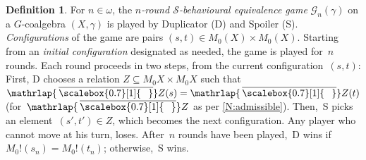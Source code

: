 \documentclass[sigconf,
			final%
			nonacm
                        ]{acmart}
\numberwithin{equation}{section}
\numberwithin{equation}{section}
\theoremstyle{plain}
\theoremstyle{definition}
\newtheorem{defn}[thm]{Definition}
\newcommand{\mybar}[3]{%
  \mathrlap{\hspace{#2}\overline{\scalebox{#1}[1]{\hphantom{\ensuremath{#3}}\vphantom{\rule{0pt}{5.5pt}}}}}\ensuremath{#3}
}
\newcommand{\barZ}{\mybar{0.7}{1.75pt}{Z}}
\newcommand{\CalG}{\mathcal{G}}             %
\newcommand{\CalS}{\mathcal{S}}        %
\begin{document}
\begin{defn}\label{def:game}
  For $n\in\omega$, the \emph{$n$-round $\CalS$-behavioural
    equivalence game} $\CalG_n(\gamma)$ on a $G$-coalgebra
  $(X, \gamma)$ is played by Duplicator (D) and Spoiler
  (S). \emph{Configurations} of the game are pairs
  $(s,t)\in M_0(X)\times M_0(X)$. Starting from an \emph{initial
    configuration} designated as needed, the game is played for~$n$
  rounds. Each round proceeds in two steps, from the current
  configuration~$(s,t)$: First, D chooses a relation
  $Z\subseteq M_0X\times M_0X$ such that $\barZ(s) = \barZ(t)$
  (for~$\barZ$ as per \cref{N:admissible}). Then,~S
  picks an element~$(s',t') \in Z$, which becomes the next configuration. Any
  player who cannot move at his turn, loses. After~$n$ rounds have
  been played,~D wins if $M_0!(s_n) = M_0!(t_n)$; otherwise,~S wins.
\end{defn}
\end{document}
